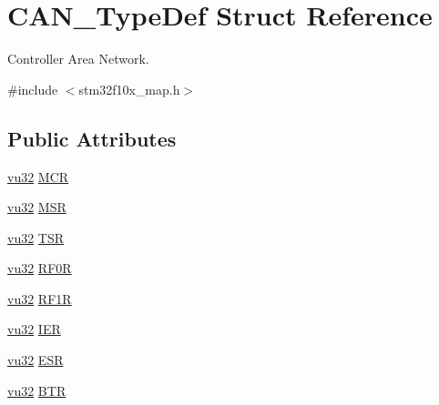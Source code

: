 \hypertarget{struct_c_a_n___type_def}{}\section{C\+A\+N\+\_\+\+Type\+Def Struct Reference}
\label{struct_c_a_n___type_def}


Controller Area Network.  




{\ttfamily \#include $<$stm32f10x\+\_\+map.\+h$>$}

\subsection*{Public Attributes}
\begin{DoxyCompactItemize}
\item 
\hyperlink{agilefox_2library_2inc_2stm32f10x__type_8h_a6e2761f0a1011f84ed96b946f2c8a563}{vu32} \hyperlink{struct_c_a_n___type_def_aed6b6f06cd9fb95ab8ca56386a4e2808}{M\+CR}
\item 
\hyperlink{agilefox_2library_2inc_2stm32f10x__type_8h_a6e2761f0a1011f84ed96b946f2c8a563}{vu32} \hyperlink{struct_c_a_n___type_def_a238ceb889aae8c3d641dc2e825705987}{M\+SR}
\item 
\hyperlink{agilefox_2library_2inc_2stm32f10x__type_8h_a6e2761f0a1011f84ed96b946f2c8a563}{vu32} \hyperlink{struct_c_a_n___type_def_a83f042976a2c6d2d4ad342958009ace1}{T\+SR}
\item 
\hyperlink{agilefox_2library_2inc_2stm32f10x__type_8h_a6e2761f0a1011f84ed96b946f2c8a563}{vu32} \hyperlink{struct_c_a_n___type_def_ad986a55b09386abcc57c32310cbfd937}{R\+F0R}
\item 
\hyperlink{agilefox_2library_2inc_2stm32f10x__type_8h_a6e2761f0a1011f84ed96b946f2c8a563}{vu32} \hyperlink{struct_c_a_n___type_def_a42a58b11f5b39c67770f9f80ad76c25e}{R\+F1R}
\item 
\hyperlink{agilefox_2library_2inc_2stm32f10x__type_8h_a6e2761f0a1011f84ed96b946f2c8a563}{vu32} \hyperlink{struct_c_a_n___type_def_a5cbdefac1fbf6721819a97fb8445305a}{I\+ER}
\item 
\hyperlink{agilefox_2library_2inc_2stm32f10x__type_8h_a6e2761f0a1011f84ed96b946f2c8a563}{vu32} \hyperlink{struct_c_a_n___type_def_acc1a4ec0a56a8fa3252682cad5009ccd}{E\+SR}
\item 
\hyperlink{agilefox_2library_2inc_2stm32f10x__type_8h_a6e2761f0a1011f84ed96b946f2c8a563}{vu32} \hyperlink{struct_c_a_n___type_def_a62b2f51fd71dee6149a8cf739fd3d284}{B\+TR}

\end{DoxyCompactItemize}
